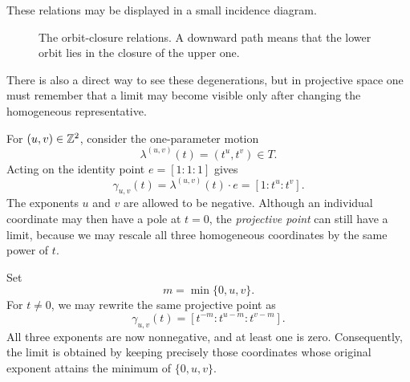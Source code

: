 These relations may be displayed in a small incidence diagram.

\begin{figure}[ht]
\centering
{}
\caption{The orbit-closure relations. A downward path means that the
lower orbit lies in the closure of the upper one.}
\label{fig:p2-orbit-closure-poset}
\end{figure}

There is also a direct way to see these degenerations, but in
projective space one must remember that a limit may become visible
only after changing the homogeneous representative.

For \((u,v)\in\mathbb{Z}^2\), consider the one-parameter motion
\[
\lambda^{(u,v)}(t)=(t^u,t^v)\in T.
\]
Acting on the identity point \(e=[1:1:1]\) gives
\[
\gamma_{u,v}(t)
=
\lambda^{(u,v)}(t)\cdot e
=
[1:t^u:t^v].
\]
The exponents \(u\) and \(v\) are allowed to be negative. Although an
individual coordinate may then have a pole at \(t=0\), the
\emph{projective point} can still have a limit, because we may rescale
all three homogeneous coordinates by the same power of \(t\).

Set
\[
m=\min\{0,u,v\}.
\]
For \(t\neq0\), we may rewrite the same projective point as
\[
\gamma_{u,v}(t)
=
[t^{-m}:t^{u-m}:t^{v-m}].
\]
All three exponents are now nonnegative, and at least one is zero.
Consequently, the limit is obtained by keeping precisely those
coordinates whose original exponent attains the minimum of
\(\{0,u,v\}\).

